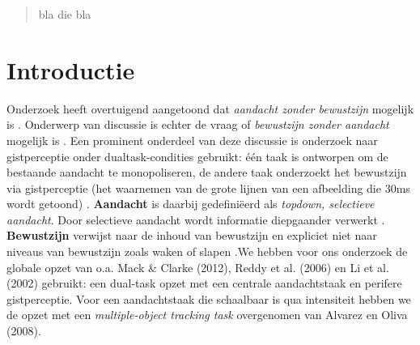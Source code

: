 \documentclass[a0,portrait]{a0poster}
\begin{document}

\begin{multicols}{3} %


\color{Navy} %

\begin{abstract}
bla die bla
\end{abstract}

\color{Black} %
\section*{Introductie}
Onderzoek heeft overtuigend aangetoond dat \textit{aandacht zonder bewustzijn} mogelijk is \cite{Jiang_Costello_Fang_Huang_He_2006, Sklar_Levy_Goldstein_Mandel_Maril_Hassin_2012, Cohen_Cavanagh_Chun_Nakayama_2012, Reddy_Reddy_Koch_2006, LiVanRullenKochPerona2002}. Onderwerp van discussie is echter de vraag of \textit{bewustzijn zonder aandacht} mogelijk is \cite{Cohen_Cavanagh_Chun_Nakayama_2012,Mack_Clarke_2012, Jennings_2015, Block_2011, Cohen_Dennett_2011, VanBoxtel_Tsuchiya_Koch_2010}. Een prominent onderdeel van deze discussie is onderzoek naar gistperceptie onder dualtask-condities gebruikt: \'{e}\'{e}n taak is ontworpen om de bestaande aandacht te monopoliseren, de andere taak onderzoekt het bewustzijn via gistperceptie (het waarnemen van de grote lijnen van een afbeelding die 30ms wordt getoond) \cite{Mack_Clarke_2012}.
\textbf{Aandacht} is daarbij gedefini\"eerd als  \textit{topdown, selectieve aandacht}. Door selectieve aandacht wordt informatie diepgaander verwerkt \cite{Cohen_Cavanagh_Chun_Nakayama_2012}. 
\textbf{Bewustzijn} verwijst naar de inhoud van bewustzijn en expliciet niet naar niveaus van bewustzijn zoals waken of slapen \cite{VanBoxtel_Tsuchiya_Koch_2010}.We hebben voor ons onderzoek de globale opzet van o.a. Mack \& Clarke (2012), Reddy et al. (2006) en Li et al. (2002) gebruikt: een dual-task opzet met een centrale aandachtstaak en perifere gistperceptie. Voor een aandachtstaak die schaalbaar is qua intensiteit hebben we de opzet met een \textit{multiple-object tracking task} overgenomen van Alvarez en Oliva (2008)\nocite{Alvarez_Oliva_2008}.\\


\end{multicols}
\end{document}
